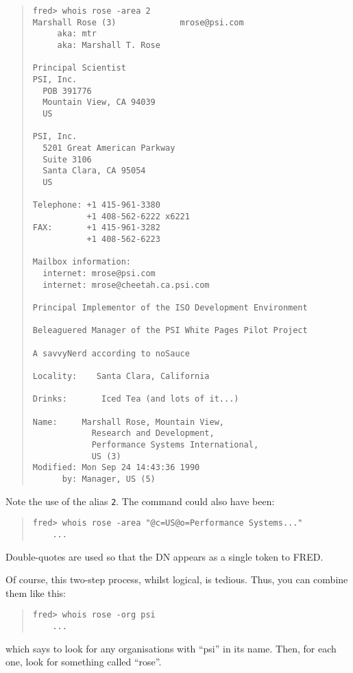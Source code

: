 \begin{quote}\small\begin{verbatim}
fred> whois rose -area 2
Marshall Rose (3)             mrose@psi.com
     aka: mtr
     aka: Marshall T. Rose

Principal Scientist
PSI, Inc.
  POB 391776
  Mountain View, CA 94039
  US

PSI, Inc.
  5201 Great American Parkway
  Suite 3106
  Santa Clara, CA 95054
  US

Telephone: +1 415-961-3380
           +1 408-562-6222 x6221
FAX:       +1 415-961-3282
           +1 408-562-6223

Mailbox information:
  internet: mrose@psi.com
  internet: mrose@cheetah.ca.psi.com

Principal Implementor of the ISO Development Environment

Beleaguered Manager of the PSI White Pages Pilot Project

A savvyNerd according to noSauce

Locality:    Santa Clara, California

Drinks:       Iced Tea (and lots of it...)

Name:     Marshall Rose, Mountain View,
            Research and Development,
            Performance Systems International,
            US (3)
Modified: Mon Sep 24 14:43:36 1990
      by: Manager, US (5)
\end{verbatim}\end{quote}
Note the use of the alias \verb"2".
The command could also have been:
\begin{quote}\small\begin{verbatim}
fred> whois rose -area "@c=US@o=Performance Systems..."
    ...
\end{verbatim}\end{quote}
Double-quotes are used so that the DN appears as a single token to FRED.

Of course,
this two-step process,
whilst logical, is tedious.
Thus, you can combine them like this:
\begin{quote}\small\begin{verbatim}
fred> whois rose -org psi
    ...
\end{verbatim}\end{quote}
which says to look for any organisations with ``psi'' in its name.
Then, for each one,
look for something called ``rose''.

